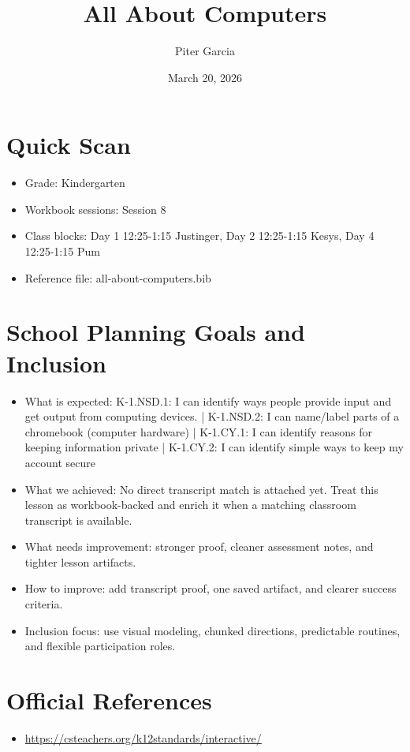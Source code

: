 \documentclass[11pt]{article}
\title{All About Computers}
\author{Piter Garcia}
\date{March 20, 2026}
\begin{document}
\maketitle
\section*{Quick Scan}
\begin{itemize}[leftmargin=*]
\item Grade: Kindergarten
\item Workbook sessions: Session 8
\item Class blocks: Day 1 12:25-1:15 Justinger, Day 2 12:25-1:15 Kesys, Day 4 12:25-1:15 Pum
\item Reference file: all-about-computers.bib
\end{itemize}
\section*{School Planning Goals and Inclusion}
\begin{itemize}[leftmargin=*]
\item What is expected: K-1.NSD.1: I can identify ways people provide input and get output from computing devices. | K-1.NSD.2: I can name/label parts of a chromebook (computer hardware) | K-1.CY.1: I can identify reasons for keeping information private | K-1.CY.2: I can identify simple ways to keep my account secure
\item What we achieved: No direct transcript match is attached yet. Treat this lesson as workbook-backed and enrich it when a matching classroom transcript is available.
\item What needs improvement: stronger proof, cleaner assessment notes, and tighter lesson artifacts.
\item How to improve: add transcript proof, one saved artifact, and clearer success criteria.
\item Inclusion focus: use visual modeling, chunked directions, predictable routines, and flexible participation roles.
\end{itemize}
\section*{Official References}
\begin{itemize}[leftmargin=*]
\item \url{https://csteachers.org/k12standards/interactive/}

\end{itemize}
\end{document}
